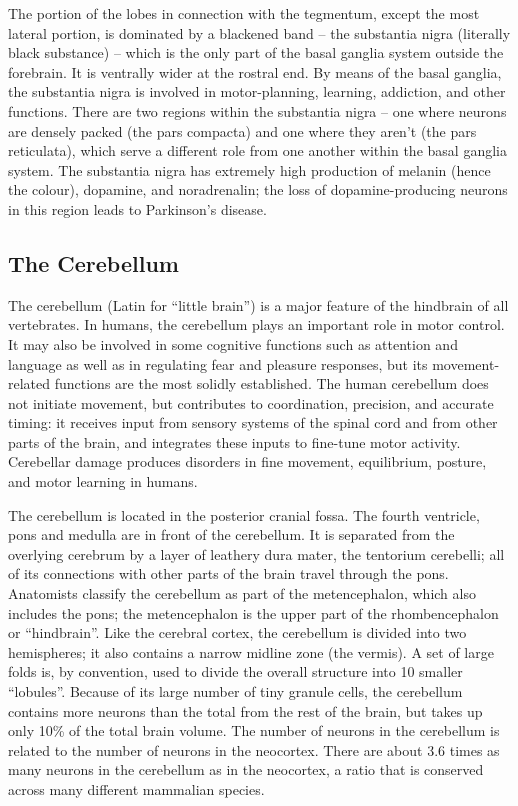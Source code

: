 \documentclass[]{book}
\begin{document}
The portion of the lobes in connection with the tegmentum, except the most lateral portion, is dominated by a blackened band -- the substantia nigra (literally black substance) -- which is the only part of the basal ganglia system outside the forebrain. It is ventrally wider at the rostral end. By means of the basal ganglia, the substantia nigra is involved in motor-planning, learning, addiction, and other functions. There are two regions within the substantia nigra -- one where neurons are densely packed (the pars compacta) and one where they aren't (the pars reticulata), which serve a different role from one another within the basal ganglia system. The substantia nigra has extremely high production of melanin (hence the colour), dopamine, and noradrenalin; the loss of dopamine-producing neurons in this region leads to Parkinson's disease.

\hypertarget{the-cerebellum}{%
\subsection{The Cerebellum}\label{the-cerebellum}}

The cerebellum (Latin for ``little brain'') is a major feature of the hindbrain of all vertebrates. In humans, the cerebellum plays an important role in motor control. It may also be involved in some cognitive functions such as attention and language as well as in regulating fear and pleasure responses, but its movement-related functions are the most solidly established. The human cerebellum does not initiate movement, but contributes to coordination, precision, and accurate timing: it receives input from sensory systems of the spinal cord and from other parts of the brain, and integrates these inputs to fine-tune motor activity. Cerebellar damage produces disorders in fine movement, equilibrium, posture, and motor learning in humans.

The cerebellum is located in the posterior cranial fossa. The fourth ventricle, pons and medulla are in front of the cerebellum. It is separated from the overlying cerebrum by a layer of leathery dura mater, the tentorium cerebelli; all of its connections with other parts of the brain travel through the pons. Anatomists classify the cerebellum as part of the metencephalon, which also includes the pons; the metencephalon is the upper part of the rhombencephalon or ``hindbrain''. Like the cerebral cortex, the cerebellum is divided into two hemispheres; it also contains a narrow midline zone (the vermis). A set of large folds is, by convention, used to divide the overall structure into 10 smaller ``lobules''. Because of its large number of tiny granule cells, the cerebellum contains more neurons than the total from the rest of the brain, but takes up only 10\% of the total brain volume. The number of neurons in the cerebellum is related to the number of neurons in the neocortex. There are about 3.6 times as many neurons in the cerebellum as in the neocortex, a ratio that is conserved across many different mammalian species.
\end{document}
